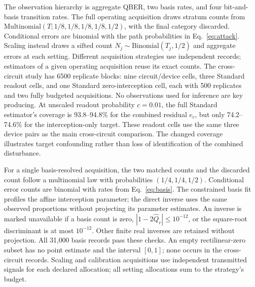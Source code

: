 The observation hierarchy is aggregate QBER, two basis rates, and four
bit-and-basis transition rates. The full operating acquisition draws stratum
counts from $\mathrm{Multinomial}(T;1/8,1/8,1/8,1/8,1/2)$, with the final category
discarded. Conditional errors are binomial with the path probabilities in
Eq.~\eqref{eq:attack}. Scaling instead draws a sifted count
$N_j\sim\mathrm{Binomial}(T_j,1/2)$ and aggregate errors at each setting.
Different acquisition strategies use independent records; estimators of a given
operating acquisition reuse its exact counts. The cross-circuit study has 6500
replicate blocks: nine circuit/device cells, three Standard readout cells, and
one Standard zero-interception cell, each with 500 replicates and two fully
budgeted acquisitions. No observations used for inference are key producing.
At unscaled readout probability $c=0.01$, the full Standard estimator's
coverage is 93.8--94.8\% for the combined residual $e_c$, but only
74.2--74.6\% for the interception-only target. These readout cells use the
same three device pairs as the main cross-circuit comparison. The changed
coverage illustrates target confounding rather than loss of identification
of the combined disturbance.



For a single basis-resolved acquisition, the two matched counts and the discarded
count follow a multinomial law with probabilities $(1/4,1/4,1/2)$. Conditional
error counts are binomial with rates from Eq.~\eqref{eq:basis}. The
constrained basis fit profiles the affine interception parameter; the direct
inverse uses the same observed proportions without projecting its parameter
estimates. An inverse is marked unavailable if a basis count is zero,
$|1-2\widehat Q_r|\leq10^{-12}$, or the square-root discriminant is at most
$10^{-12}$. Other finite real inverses are retained without projection. All
31,000 basis records pass these checks. An empty rectilinear-zero subset has no
point estimate and the interval $[0,1]$; none occurs in the cross-circuit records. Scaling and
calibration acquisitions use independent transmitted signals for each declared
allocation; all setting allocations sum to the strategy's budget.

